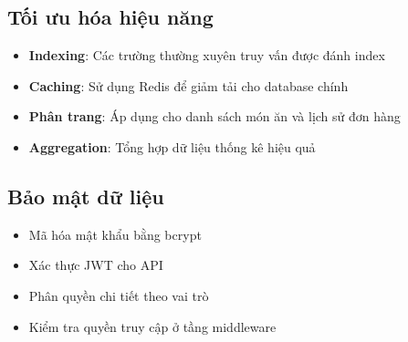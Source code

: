 \subsection{Tối ưu hóa hiệu năng}
\begin{itemize}
    \item \textbf{Indexing}: Các trường thường xuyên truy vấn được đánh index
    \item \textbf{Caching}: Sử dụng Redis để giảm tải cho database chính
    \item \textbf{Phân trang}: Áp dụng cho danh sách món ăn và lịch sử đơn hàng
    \item \textbf{Aggregation}: Tổng hợp dữ liệu thống kê hiệu quả
\end{itemize}

\subsection{Bảo mật dữ liệu}
\begin{itemize}
    \item Mã hóa mật khẩu bằng bcrypt
    \item Xác thực JWT cho API
    \item Phân quyền chi tiết theo vai trò
    \item Kiểm tra quyền truy cập ở tầng middleware
\end{itemize}
